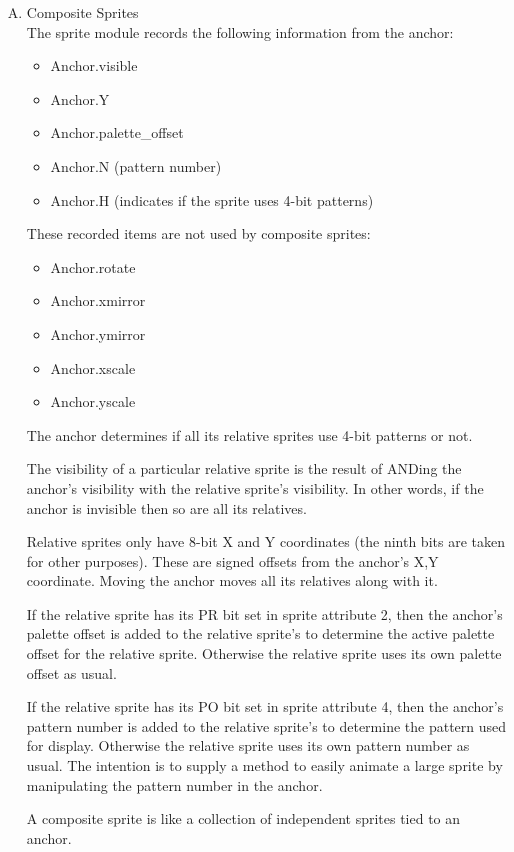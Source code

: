 \begin{enumerate}[A.]
\item Composite Sprites\\
  The sprite module records the following information from the anchor:
  \begin{itemize}
  \item Anchor.visible
  \item Anchor.Y
  \item Anchor.palette\_offset
  \item Anchor.N (pattern number)
  \item Anchor.H (indicates if the sprite uses 4-bit patterns)
  \end{itemize}
  These recorded items are not used by composite sprites:
  \begin{itemize}
  \item Anchor.rotate
  \item Anchor.xmirror
  \item Anchor.ymirror
  \item Anchor.xscale
  \item Anchor.yscale
  \end{itemize}
  The anchor determines if all its relative sprites use 4-bit patterns or not.
  
  The visibility of a particular relative sprite is the result of
  ANDing the anchor’s visibility with the relative sprite’s
  visibility. In other words, if the anchor is invisible then so are
  all its relatives.

  Relative sprites only have 8-bit X and Y coordinates (the ninth bits
  are taken for other purposes). These are signed offsets from the
  anchor’s X,Y coordinate. Moving the anchor moves all its relatives
  along with it.

  If the relative sprite has its PR bit set in sprite attribute 2,
  then the anchor’s palette offset is added to the relative sprite’s
  to determine the active palette offset for the relative
  sprite. Otherwise the relative sprite uses its own palette offset as
  usual.

  If the relative sprite has its PO bit set in sprite attribute 4,
  then the anchor’s pattern number is added to the relative sprite’s
  to determine the pattern used for display. Otherwise the relative
  sprite uses its own pattern number as usual. The intention is to
  supply a method to easily animate a large sprite by manipulating the
  pattern number in the anchor.

  A composite sprite is like a collection of independent sprites tied
  to an anchor.


\end{enumerate}
